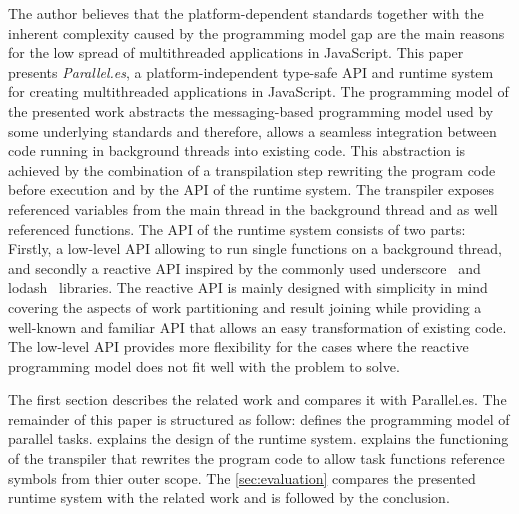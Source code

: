 The author believes that the platform-dependent standards together with the inherent complexity caused by the programming model gap are the main reasons for the low spread of multithreaded applications in JavaScript. This paper presents \textit{Parallel.es}, a platform-independent type-safe API and runtime system for creating multithreaded applications in JavaScript. The programming model of the presented work abstracts the messaging-based programming model used by some underlying standards and therefore, allows a seamless integration between code running in background threads into existing code. This abstraction is achieved by the combination of a transpilation step rewriting the program code before execution and by the API of the runtime system. The transpiler exposes referenced variables from the main thread in the background thread and as well referenced functions. The API of the runtime system consists of two parts: Firstly, a low-level API allowing to run single functions on a background thread, and secondly a reactive API inspired by the commonly used underscore~\cite{underscorejs} and lodash~\cite{lodash} libraries. The reactive API is mainly designed with simplicity in mind covering the aspects of work partitioning and result joining while providing a well-known and familiar API that allows an easy transformation of existing code. The low-level API provides more flexibility for the cases where the reactive programming model does not fit well with the problem to solve.


The first section describes the related work and compares it with Parallel.es. The remainder of this paper is structured as follow:  defines the programming model of parallel tasks.  explains the design of the runtime system.  explains the functioning of the transpiler that rewrites the program code to allow task functions reference symbols from thier outer scope. The \cref{sec:evaluation} compares the presented runtime system with the related work and is followed by the conclusion. 